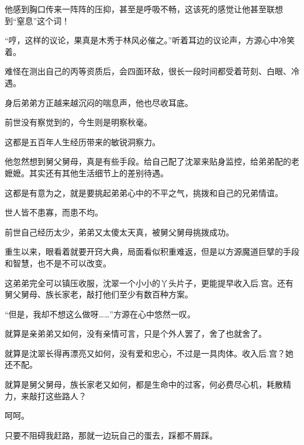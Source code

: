 \begin{this_body}
他感到胸口传来一阵阵的压抑，甚至是呼吸不畅，这该死的感觉让他甚至联想到“窒息”这个词！

“哼，这样的议论，果真是木秀于林风必催之。”听着耳边的议论声，方源心中冷笑着。

难怪在测出自己的丙等资质后，会四面环敌，很长一段时间都受着苛刻、白眼、冷遇。

身后弟弟方正越来越沉闷的喘息声，他也尽收耳底。

前世没有察觉到的，今生则是明察秋毫。

这都是五百年人生经历带来的敏锐洞察力。

他忽然想到舅父舅母，真是有些手段。给自己配了沈翠来贴身监控，给弟弟配的老嬷嬷。其实还有其他生活细节上的差别待遇。

这都是有意为之，就是要挑起弟弟心中的不平之气，挑拨和自己的兄弟情谊。

世人皆不患寡，而患不均。

前世自己经历太少，弟弟又太傻太天真，被舅父舅母挑拨成功。

重生以来，眼看着就要开窍大典，局面看似积重难返，但是以方源魔道巨擘的手段和智慧，也不是不可以改变。

这弟弟完全可以镇压收服，沈翠一个小小的丫头片子，更能提早收入后.宫。还有舅父舅母、族长家老，敲打他们至少有数百种方案。

“但是，我却不想这么做呀……”方源在心中悠然一叹。

就算是亲弟弟又如何，没有亲情可言，只是个外人罢了，舍了也就舍了。

就算是沈翠长得再漂亮又如何，没有爱和忠心，不过是一具肉体。收入后.宫？她还不配。

就算是舅父舅母，族长家老又如何，都是生命中的过客，何必费尽心机，耗散精力，来敲打这些路人？

呵呵。

只要不阻碍我赶路，那就一边玩自己的蛋去，踩都不屑踩。

\end{this_body}

